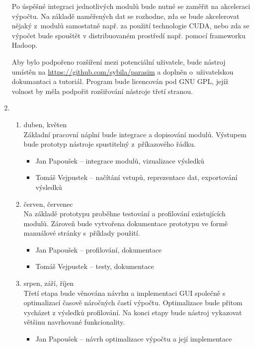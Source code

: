 \documentclass[a4paper]{article}
\begin{document}
\begin{enumerate}
        Po úspěšné integraci jednotlivých modulů bude nutné se zaměřit na akceleraci
        výpočtu. Na základě naměřených dat se rozhodne, zda se bude akcelerovat
        nějaký z~modulů samostatně např. za použití technologie CUDA,
        nebo zda se výpočet bude spouštět v distribuovaném prostředí např. pomocí frameworku
        Hadoop.

        Aby bylo podpořeno rozšíření mezi potenciální uživatele, bude nástroj
        umístěn na \url{https://github.com/sybila/parasim} a doplněn o~uživatelskou
        dokumantaci a tutoriál.
        Program bude licencován pod GNU GPL, jejíž volnost
        by měla podpořit rozšiřování nástroje třetí stranou.

\item\begin{enumerate}
	\item duben, květen\\
		Základní pracovní náplní bude integrace a dopisování modulů. Výstupem bude
        prototyp nástroje spustitelný z~příkazového řádku.
        \begin{itemize}
            \item   Jan Papoušek -- integrace modulů, vizualizace výsledků
            \item   Tomáš Vejpustek -- načítání vstupů, reprezentace dat, exportování výsledků
        \end{itemize}
	\item červen, červenec\\
		Na základě prototypu proběhne testování a profilování existujících modulů.
		Zároveň bude vytvořena dokumentace prototypu ve formě manuálové stránky s~příklady použití.
        \begin{itemize}
            \item   Jan Papoušek -- profilování, dokumentace
            \item   Tomáš Vejpustek -- testy, dokumentace
        \end{itemize}
	\item srpen, září, říjen\\
		Třetí etapa bude věnována návrhu a implementaci GUI společně s optimalizací časově
        náročných častí výpočtu. Optimalizace bude přitom vycházet z výsledků profilování.
        Na konci etapy bude nástroj vykazovat většinu navrhované funkcionality.
        \begin{itemize}
            \item   Jan Papoušek -- návrh optimalizace výpočtu a její implementace

\end{itemize}
\end{enumerate}
\end{enumerate}
\end{document}
